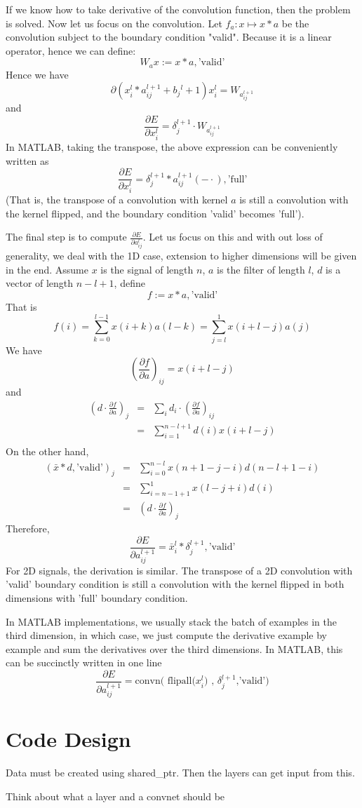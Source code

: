 \documentclass[12pt, reqno]{amsart}
\begin{document}
If we know how to take derivative of the convolution function, then
the problem is solved. Now let us focus on the convolution. Let $f_a :
x \mapsto x*a $ be the convolution subject to the boundary condition
"valid". Because it is a linear operator, hence we can define:
\[
W_a x:= x*a,\textrm{'valid'}
\]
Hence we have
\[
 \partial {(x_i^{l}*a_{ij}^{l+1}+b_j{^l+1})}{x_i^{l}}=W_{a_{ij}^{l+1}}
\]
and
\[
\frac{\partial E}{\partial x_{i}^{l}} = \delta_{j}^{l+1}\cdot W_{a_{ij}^{l+1}}
\]
In MATLAB, taking the transpose, the above expression can be
conveniently written as
\[
\frac{\partial E}{\partial x_{i}^{l}} = \delta_{j}^{l+1} * a_{ij}^{l+1}(-\cdot),\textrm{'full'}
\]
(That is, the transpose of a convolution with kernel $a$ is still a convolution with the kernel flipped, and the boundary condition 'valid' becomes 'full').

The final step is to compute $\frac{\partial E}{\partial a_{ij}^{l}}$. Let us focus on this and with out loss of generality, we deal with the 1D case, extension to higher dimensions will be given in the end.
Assume $x$ is the signal of length $n$, $a$ is the filter of length $l$, $d$ is a vector of length $n-l+1$, define
\[
f:=x*a, \textrm{'valid'}
\]
That is
\[
f(i)=\sum_{k=0}^{l-1}x(i+k)a(l-k)=\sum_{j=l}^{1} x(i+l-j)a(j)
\]
We have
\[
\left(\frac{\partial f}{\partial a}\right)_{ij}=x(i+l-j)
\]
and
\begin{eqnarray*}
	(d\cdot \frac{\partial f}{\partial a})_j &=& \sum_{i}d_i \cdot (\frac{\partial f}{\partial a})_{ij} \\
								&=&\sum_{i=1}^{n-l+1}d(i)x(i+l-j)\\
\end{eqnarray*}
On the other hand,
\begin{eqnarray*}
(\bar x*d,\textrm{'valid'} )_j &=& \sum_{i=0}^{n-l} x(n+1-j-i)d(n-l+1-i) \\
&= &\sum_{i=n-1+1}^{1}x(l-j+i)d(i)\\
&=& (d\cdot \frac{\partial f}{\partial a})_j 
\end{eqnarray*}
Therefore,
\[
\frac{\partial E}{\partial a_{ij}^{l+1}}=\bar{x}^{l}_i * \delta^{l+1}_{j}, \textrm{'valid'}
\]
For 2D signals, the derivation is similar. The transpose of a 2D convolution with 'valid' boundary condition is still a convolution with the kernel flipped in both dimensions with 'full' boundary condition. 

In MATLAB implementations, we usually stack the batch of examples in the third dimension, in which case, we just compute the derivative example by example and sum the derivatives over the third dimensions. In MATLAB, this can be succinctly written in one line
\[
	\frac{\partial E}{\partial a_{ij}^{l+1}}=\textrm{convn( flipall($x^{l}_i$) , $\delta^{l+1}_{j}$,'valid')}
\]


\section*{Code Design}
Data must be created using shared\_ptr.  Then the layers can get input from this.

Think about what a layer and a convnet should be
\end{document}
